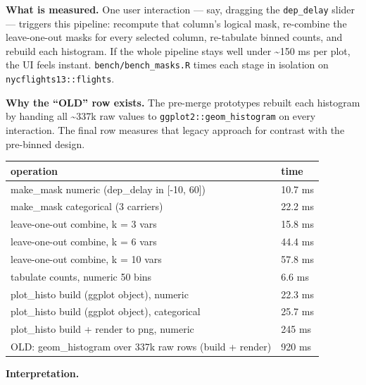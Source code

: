 \documentclass[
  11pt,
]{article}
\newcounter{none} %
\begin{document}
\textbf{What is measured.} One user interaction --- say, dragging the
\texttt{dep\_delay} slider --- triggers this pipeline: recompute that
column's logical mask, re-combine the leave-one-out masks for every
selected column, re-tabulate binned counts, and rebuild each histogram.
If the whole pipeline stays well under \textasciitilde150 ms per plot,
the UI feels instant. \texttt{bench/bench\_masks.R} times each stage in
isolation on \texttt{nycflights13::flights}.

\textbf{Why the ``OLD'' row exists.} The pre-merge prototypes rebuilt
each histogram by handing all \textasciitilde337k raw values to
\texttt{ggplot2::geom\_histogram} on every interaction. The final row
measures that legacy approach for contrast with the pre-binned design.

{\def\LTcaptype{none} %
\begin{longtable}[]{@{}ll@{}}
\toprule\noalign{}
operation & time \\
\midrule\noalign{}
\endhead
\bottomrule\noalign{}
\endlastfoot
make\_mask numeric (dep\_delay in {[}-10, 60{]}) & 10.7 ms \\
make\_mask categorical (3 carriers) & 22.2 ms \\
leave-one-out combine, k = 3 vars & 15.8 ms \\
leave-one-out combine, k = 6 vars & 44.4 ms \\
leave-one-out combine, k = 10 vars & 57.8 ms \\
tabulate counts, numeric 50 bins & 6.6 ms \\
plot\_histo build (ggplot object), numeric & 22.3 ms \\
plot\_histo build (ggplot object), categorical & 25.7 ms \\
plot\_histo build + render to png, numeric & 245 ms \\
OLD: geom\_histogram over 337k raw rows (build + render) & 920 ms \\
\end{longtable}
}

\textbf{Interpretation.}
\end{document}
